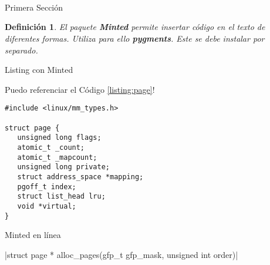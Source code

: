 \documentclass{article}
\title{                                             %
    \vspace{2in}
    \textmd{\textbf{\asignatura \\ \titulo}} \\         %
    \normalsize\vspace{0.1in}\small{\fecha}  \\         %
    \vspace{3in}
}
\author{\textbf{\autor}}                            %
\date{}                                             %
\newtheorem{definition}{Definición}[section]  %
\begin{document}
\maketitle



\newpage
\tableofcontents
\listoflistings      %
\newpage


\begin{section}{Primera Sección}

\begin{definition}
El paquete \textbf{Minted} permite insertar código en el texto de diferentes formas.
Utiliza para ello \textbf{pygments}. Este se debe instalar por separado.
\end{definition}

\begin{subsection}{Listing con Minted}

\lipsum[1]

Puedo referenciar el Código \ref{listing:page}! 

\begin{listing}
\caption{Estructura que representa una Página en Linux}
\begin{verbatim}
#include <linux/mm_types.h>

struct page {
   unsigned long flags;
   atomic_t _count;
   atomic_t _mapcount;
   unsigned long private;
   struct address_space *mapping;
   pgoff_t index;
   struct list_head lru;
   void *virtual;
}
\end{verbatim}
\label{listing:page}
\end{listing}

\lipsum[2]

\end{subsection}

\begin{subsection}{Minted en línea}

\lipsum[3]

|struct page * alloc_pages(gfp_t gfp_mask, unsigned int order)|

\lipsum[4]

\end{subsection}

\end{section}
\end{document}
